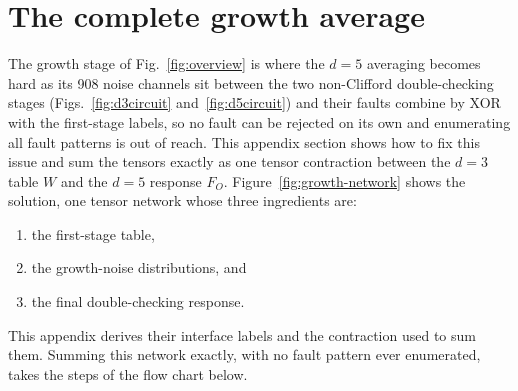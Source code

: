 
\providecommand{\hl}[2]{\colorbox{#1!22}{#2}}
\section{The complete growth average}\label{app:growth}

The growth stage of Fig.~\ref{fig:overview} is where the $d=5$ averaging becomes hard as its 908 noise channels sit between the two non-Clifford double-checking stages (Figs.~\ref{fig:d3circuit} and~\ref{fig:d5circuit}) and their faults combine by XOR with the first-stage labels, so no fault can be rejected on its own and enumerating all fault patterns is out of reach.
This appendix section shows how to fix this issue and sum the tensors exactly as one tensor contraction between the $d=3$ table $W$ and the $d=5$ response $F_O$.
Figure~\ref{fig:growth-network} shows the solution, one tensor network whose three ingredients are:
\begin{enumerate}
\item the first-stage table, 
\item the growth-noise distributions, and 
\item  the final double-checking response. 
\end{enumerate}
This appendix derives their interface labels and the contraction used to sum them. 
Summing this network exactly, with no fault pattern ever enumerated, takes the steps of the flow chart below.

\begin{center}
\end{center}

